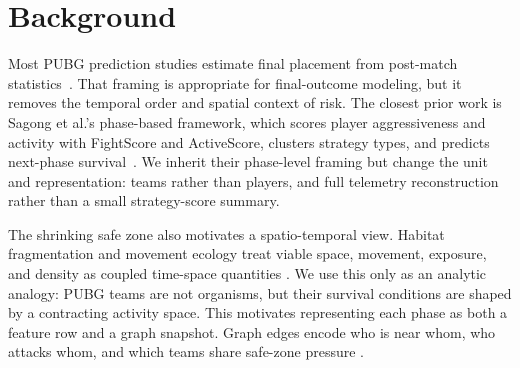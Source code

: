 \section{Background}
\label{sec:background}

Most PUBG prediction studies estimate final placement from post-match
statistics~\cite{kagglePubgFinishPlacement,sen2021pubgFinalRank,lee2025pubgRank}.
That framing is appropriate for final-outcome modeling, but it removes the
temporal order and spatial context of risk. The closest prior work is Sagong
et al.'s phase-based framework, which scores player aggressiveness and
activity with FightScore and ActiveScore, clusters strategy types, and
predicts next-phase survival~\cite{sagong2025hunterCamper}. We inherit their
phase-level framing but change the unit and representation: teams rather than
players, and full telemetry reconstruction rather than a small strategy-score
summary.

The shrinking safe zone also motivates a spatio-temporal view. Habitat
fragmentation and movement ecology treat viable space, movement, exposure,
and density as coupled time-space quantities
\cite{fahrig2003fragmentation,nathan2008movement}. We use this only as an
analytic analogy: PUBG teams are not organisms, but their survival conditions
are shaped by a contracting activity space. This motivates representing each
phase as both a feature row and a graph snapshot. Graph edges encode who is
near whom, who attacks whom, and which teams share safe-zone pressure
\cite{sanchezLengeling2021gnnIntro}.
